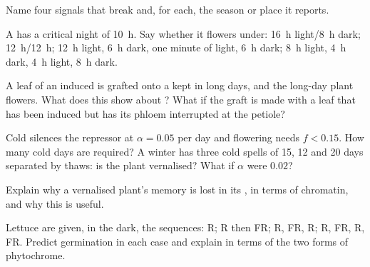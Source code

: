 \begin{exercise}[$\star$]\label{exo:b2:plant-flowering:4}
Name four signals that break   and, for each, the season
or place it reports.
\end{exercise}

\begin{exercise}[$\star\star$]\label{exo:b2:plant-flowering:5}
A  has a critical night of \qty{10}{h}. Say whether
it flowers under: \qty{16}{h} light/\qty{8}{h} dark; \qty{12}{h}/\qty{12}{h};
\qty{12}{h} light, \qty{6}{h} dark, one minute of light, \qty{6}{h} dark;
\qty{8}{h} light, \qty{4}{h} dark, \qty{4}{h} light, \qty{8}{h} dark.
\end{exercise}

\begin{exercise}[$\star\star$]\label{exo:b2:plant-flowering:6}
A leaf of an induced  is grafted onto a  kept in long days, and the long-day plant flowers. What does
this show about ? What if the graft is made with a leaf
that has been induced but has its phloem interrupted at the
petiole?
\end{exercise}

\begin{exercise}[$\star\star$]\label{exo:b2:plant-flowering:7}
Cold silences the repressor at $\alpha = 0.05$ per day and
flowering needs $f < 0.15$. How many cold days are required? A
winter has three cold spells of 15, 12 and 20 days separated by
thaws: is the plant vernalised? What if $\alpha$ were $0.02$?
\end{exercise}

\begin{exercise}[$\star\star$]\label{exo:b2:plant-flowering:8}
Explain why a vernalised plant's memory is lost in its , in
terms of chromatin, and why this is useful.
\end{exercise}

\begin{exercise}[$\star\star$]\label{exo:b2:plant-flowering:9}
Lettuce  are given, in the dark, the sequences: R; R then FR;
R, FR, R; R, FR, R, FR. Predict germination in each case and
explain in terms of the two forms of phytochrome.
\end{exercise}

